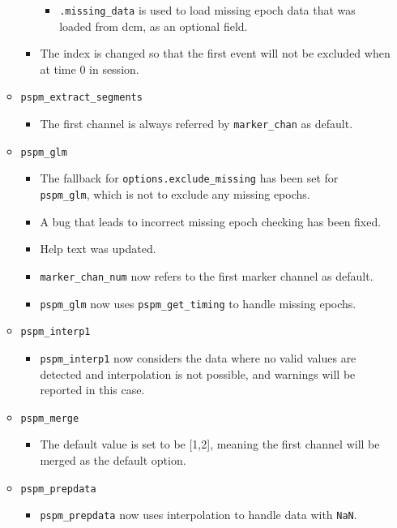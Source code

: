 \documentclass[english]{article}
\numberwithin{equation}{section}
\numberwithin{figure}{section}
\begin{document}
\begin{itemize}
\begin{itemize}
\begin{itemize}
\begin{itemize}
    			\item \texttt{.missing\_data} is used to load missing epoch data that was loaded from dcm, as an optional field.
    		\end{itemize}
    		\item The index is changed so that the first event will not be excluded when at time 0 in session.
    	\end{itemize}
    	\item \texttt{pspm\_extract\_segments}
    	\begin{itemize}
    		\item The first channel is always referred by \texttt{marker\_chan} as default.
    	\end{itemize}
    	\item \texttt{pspm\_glm}
    	\begin{itemize}
    		\item The fallback for \texttt{options.exclude\_missing} has been set for \texttt{pspm\_glm}, which is not to exclude any missing epochs.
    		\item A bug that leads to incorrect missing epoch checking has been fixed.
    		\item Help text was updated.
    		\item \texttt{marker\_chan\_num} now refers to the first marker channel as default.
    		\item \texttt{pspm\_glm} now uses \texttt{pspm\_get\_timing} to handle missing epochs.
    	\end{itemize}
    	\item \texttt{pspm\_interp1}
    	\begin{itemize}
    		\item \texttt{pspm\_interp1} now considers the data where no valid values are detected and interpolation is not possible, and warnings will be reported in this case.
    	\end{itemize}
    	\item \texttt{pspm\_merge}
    	\begin{itemize}
    		\item The default value is set to be [1,2], meaning the first channel will be merged as the default option.
    	\end{itemize}
    	\item \texttt{pspm\_prepdata}
    	\begin{itemize}
    		\item \texttt{pspm\_prepdata} now uses interpolation to handle data with \texttt{NaN}.

\end{itemize}
\end{itemize}
\end{itemize}
\end{document}
